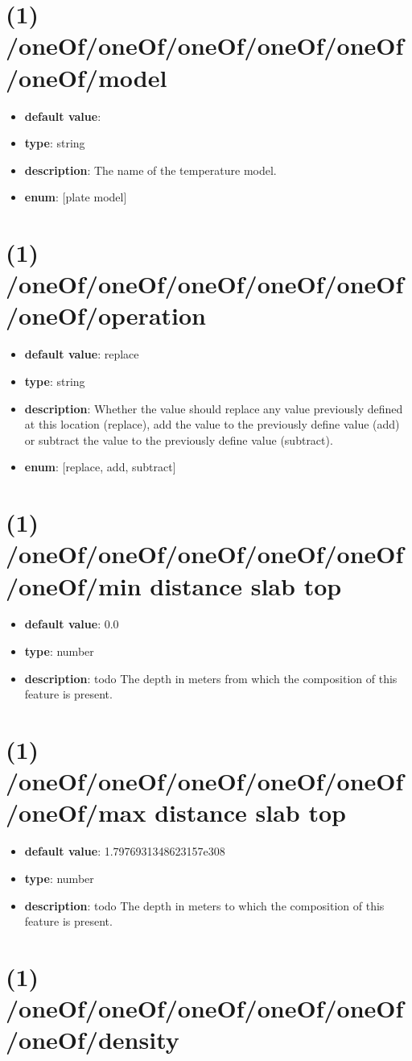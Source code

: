 \section{(1) /oneOf/oneOf/oneOf/oneOf/oneOf/oneOf/model}
\begin{itemize}[leftmargin=1em]\item {\bf default value}: 
\item {\bf type}: string
\item {\bf description}: The name of the temperature model.
\item {\bf enum}: [plate model]\end{itemize}\section{(1) /oneOf/oneOf/oneOf/oneOf/oneOf/oneOf/operation}
\begin{itemize}[leftmargin=1em]\item {\bf default value}: replace
\item {\bf type}: string
\item {\bf description}: Whether the value should replace any value previously defined at this location (replace), add the value to the previously define value (add) or subtract the value to the previously define value (subtract).
\item {\bf enum}: [replace, add, subtract]\end{itemize}\section{(1) /oneOf/oneOf/oneOf/oneOf/oneOf/oneOf/min distance slab top}
\begin{itemize}[leftmargin=1em]\item {\bf default value}: 0.0
\item {\bf type}: number
\item {\bf description}: todo The depth in meters from which the composition of this feature is present.
\end{itemize}\section{(1) /oneOf/oneOf/oneOf/oneOf/oneOf/oneOf/max distance slab top}
\begin{itemize}[leftmargin=1em]\item {\bf default value}: 1.7976931348623157e308
\item {\bf type}: number
\item {\bf description}: todo The depth in meters to which the composition of this feature is present.
\end{itemize}\section{(1) /oneOf/oneOf/oneOf/oneOf/oneOf/oneOf/density}
